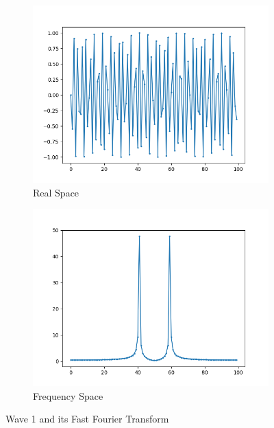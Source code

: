 \documentclass{amsproc}
\begin{document}
\begin{figure}[h]
\centering
\begin{subfigure}{.4\textwidth}
	\centering
	\includegraphics[scale=.3]{FFTOriginal1.png}
	\caption{Real Space}
	\label{fig:sub1}
\end{subfigure} %
\begin{subfigure}{.4\textwidth}
	\centering
	\includegraphics[scale=.3]{FFTResult1.png}
	\caption{Frequency Space}
	\label{fig:sub2}
\end{subfigure}
\caption{Wave 1 and its Fast Fourier Transform}
\label{fig:text1}
\end{figure}
\end{document}
